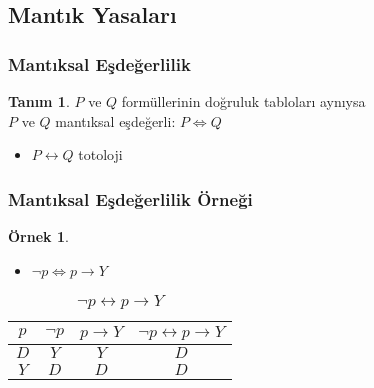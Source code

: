 \documentclass[dvipsnames]{beamer}
\theoremstyle{definition}
\newtheorem{tanim}[theorem]{Tanım}
\theoremstyle{example}
\newtheorem{ornek}[theorem]{Örnek}
\theoremstyle{plain}
\begin{document}
\subsection{Mantık Yasaları}

\begin{frame}
  \frametitle{Mantıksal Eşdeğerlilik}

  \begin{tanim}
    $P$ ve $Q$ formüllerinin doğruluk tabloları aynıysa\\
      $P$ ve $Q$ \alert{mantıksal eşdeğerli}: $P \Leftrightarrow Q$
  \end{tanim}

  \begin{itemize}
    \item $P \leftrightarrow Q$ totoloji
  \end{itemize}
\end{frame}

\begin{frame}
  \frametitle{Mantıksal Eşdeğerlilik Örneği}

  \begin{ornek}
    \begin{itemize}
      \item $\neg p \Leftrightarrow p \rightarrow Y$
    \end{itemize}

    \begin{table}
      \caption{$\neg p \leftrightarrow p \rightarrow Y$}
      \begin{tabular}{|c|c|c||c|}\hline
        $p$ & $\neg p$ & $p \rightarrow Y$
            & $\neg p \leftrightarrow p \rightarrow Y$\\\hline\hline
        $D$ & $Y$ & $Y$ & $D$\\\hline
        $Y$ & $D$ & $D$ & $D$\\\hline
      \end{tabular}
    \end{table}
  \end{ornek}
\end{frame}
\end{document}
